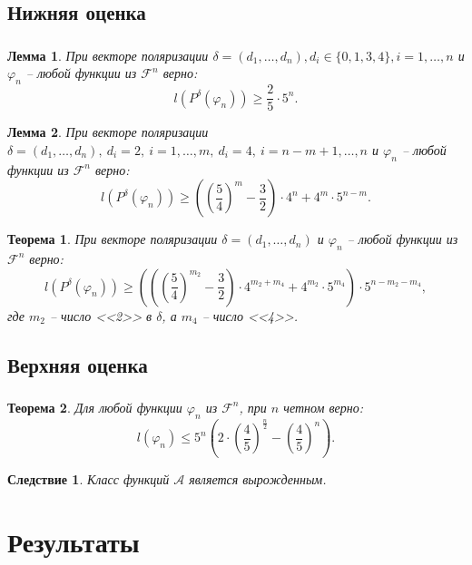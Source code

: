 \documentclass[t]{beamer}
\newtheorem{myth}{Теорема}
\newtheorem{mylm}{Лемма}
\newtheorem*{myco}{Следствие}
\newcommand{\pphi}[1] {P^{\delta}(\varphi_{#1})}
\begin{document}
\subsection{Нижняя оценка}
\begin{frame}
\frametitle{\insertsection}
\framesubtitle{\insertsubsection}
 {
\begin{mylm}
При векторе поляризации $\delta = (d_1,\dots,d_n), d_i \in \{0,1,3,4\}, i = 1,\dots,n$ и
$\varphi_n$ -- любой функции из $\mathcal{F}^n$ верно:
$$l(\pphi{n}) \geqslant \frac{2}{5} \cdot 5^n.$$
\end{mylm}
}
 {
\begin{mylm}
\label{lm24l}
При векторе поляризации $\delta=(d_1,\dots,d_n),\ d_i = 2,\ i=1,\dots,m,\ d_i=4,{\ i=n-m+1,\dots,n}$
и $\varphi_n$ -- любой функции из $\mathcal{F}^n$ верно:
$$l(\pphi{n})\geqslant\left(\left(\frac{5}{4}\right)^m-\frac{3}{2}\right)\cdot4^n+4^m\cdot5^{n-m}.$$
\end{mylm}
}
 {
\begin{myth}
При векторе поляризации $\delta=(d_1,\dots,d_n)$ и $\varphi_n$ -- любой функции из
$\mathcal{F}^n$ верно: $$l(\pphi{n}) \geqslant \left(\left(\left(\frac{5}{4}\right)^{m_2}-
\frac{3}{2}\right) \cdot 4^{m_2+m_4}+4^{m_2}\cdot 5^{m_4} \right) \cdot 5^{n-m_2-m_4},$$
где $m_2$ -- число <<2>> в $\delta$, а $m_4$ -- число <<4>>.
\end{myth}
}
\end{frame}

\subsection{Верхняя оценка}
\begin{frame}
\frametitle{\insertsection}
\framesubtitle{\insertsubsection}
 {
\begin{myth}
\label{thh}
Для любой функции $\varphi_n$ из $\mathcal{F}^n$, при $n$ четном верно:
$$ l(\varphi_n) \leqslant 5^n\left(2\cdot\left(\frac{4}{5}\right)^{\frac{n}{2}} -
\left( \frac{4}{5} \right)^n\right).$$
\end{myth}
}
 {
\begin{myco}
Класс функций $\mathcal{A}$ является вырожденным.
\end{myco}
}
\end{frame}

\section{Результаты}
\end{document}
